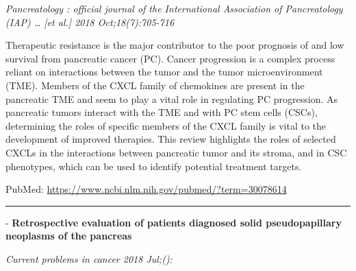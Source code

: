 \documentclass[]{article}
\begin{document}
\emph{Pancreatology : official journal of the International Association
of Pancreatology (IAP) \ldots{} {[}et al.{]} 2018 Oct;18(7):705-716}

Therapeutic resistance is the major contributor to the poor prognosis of
and low survival from pancreatic cancer (PC). Cancer progression is a
complex process reliant on interactions between the tumor and the tumor
microenvironment (TME). Members of the CXCL family of chemokines are
present in the pancreatic TME and seem to play a vital role in
regulating PC progression. As pancreatic tumors interact with the TME
and with PC stem cells (CSCs), determining the roles of specific members
of the CXCL family is vital to the development of improved therapies.
This review highlights the roles of selected CXCLs in the interactions
between pancreatic tumor and its stroma, and in CSC phenotypes, which
can be used to identify potential treatment targets.

PubMed: \url{https://www.ncbi.nlm.nih.gov/pubmed/?term=30078614}

{}

{}

\begin{center}\rule{0.5\linewidth}{\linethickness}\end{center}

 - \textbf{Retrospective evaluation of patients diagnosed solid
pseudopapillary neoplasms of the pancreas}

\emph{Current problems in cancer 2018 Jul;():}
\end{document}
